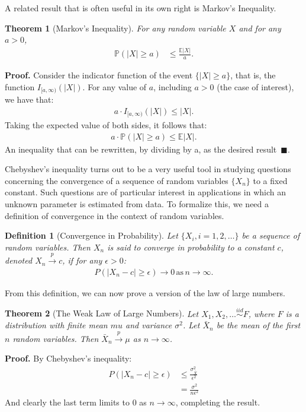\documentclass{tufte-handout}
\newtheorem{mydef}{Definition}
\newtheorem{thm}{Theorem}
\newcommand{\iid}{\stackrel{iid}{\sim}}
\begin{document}
A related result that is often useful in its own right is Markov's Inequality.

\begin{thm}[Markov's Inequality]
For any random variable $X$ and for any $a > 0$,
\begin{align*}
\mathbb{P} (|X| \geq a) &\leq \frac{\mathbb{E}|X|}{a}.
\end{align*}
\end{thm}
\textbf{Proof.} Consider the indicator function of the event
$\{|X| \geq a \}$, that is, the function $I_{[a, \infty)}(|X|)$.
For any value of $a$, including $a > 0$ (the case
of interest), we have that:
\begin{align*}
a \cdot I_{[a, \infty)}(|X|) \leq |X|.
\end{align*}
Taking the expected value of both sides, it follows that:
\begin{align*}
a \cdot \mathbb{P}(|X| \geq a) \leq \mathbb{E}|X|.
\end{align*}
An inequality that can be rewritten, by dividing by a, as the desired
result~$\blacksquare$.

Chebyshev's inequality turns out to be a very useful tool in studying
questions concerning the convergence of a sequence of random variables
$\{X_n\}$ to a fixed constant. Such questions are of
particular interest in applications in which an unknown parameter is
estimated from data. To formalize this, we need a definition of
convergence in the context of random variables.

\begin{mydef}[Convergence in Probability]
Let $\{X_i, i = 1, 2, \ldots \}$ be a sequence of random variables.
Then $X_n$ is said to converge in probability to a constant $c$,
denoted $X_n \xrightarrow{p} c$, if for any $\epsilon > 0$:
\begin{align*}
P\left( |X_n - c| \geq \epsilon \right) \rightarrow 0 \, \text{as} \, n \rightarrow \infty.
\end{align*}
\end{mydef}

From this definition, we can now prove a version of the law of large
numbers.

\begin{thm}[The Weak Law of Large Numbers]
Let $X_1, X_2, \ldots \iid  F$, where $F$ is a distribution
with finite mean $mu$ and variance $\sigma^2$. Let $\bar{X}_n$ be
the mean of the first $n$ random variables. Then $\bar{X}_n \xrightarrow{p} \mu$
as $n \rightarrow \infty$.
\end{thm}
\textbf{Proof.} By Chebyshev's inequality:
\begin{align*}
P\left( |X_n - c| \geq \epsilon \right) &\leq \frac{\sigma^2_{\bar{X}}}{\epsilon^2} \\
&= \frac{\sigma^2}{n \epsilon^2}
\end{align*}
And clearly the last term limits to $0$ as $n \rightarrow \infty$, completing
the result.
\end{document}
